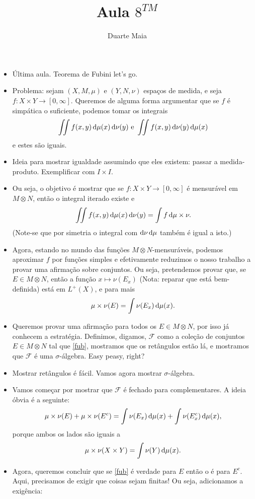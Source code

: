 \documentclass{article}
\title{Aula $8^{TM}$}
\author{Duarte Maia}
\date{}
\renewcommand{\cal}[1]{\mathcal{#1}}
\begin{document}
\maketitle

\begin{itemize}
\item Última aula. Teorema de Fubini let's go.
\item Problema: sejam $(X,M,\mu)$ e $(Y,N,\nu)$ espaços de medida, e seja $f : X \times Y \to [0,\infty]$. Queremos de alguma forma argumentar que se $f$ é simpática o suficiente, podemos tomar os integrais
\[\iint f(x,y) \dif \mu(x) \dif \nu(y) \text{ e } \iint f(x,y) \dif \nu(y) \dif \mu(x)\]
e estes são iguais.
\item Ideia para mostrar igualdade assumindo que eles existem: passar a medida-produto. Exemplificar com $I \times I$.
\item Ou seja, o objetivo é mostrar que se $f : X \times Y \to [0,\infty]$ é mensurável em $M \otimes N$, então o integral iterado existe e
\[\iint f(x,y) \dif \mu(x) \dif \nu(y) = \int f \dif \mu \times \nu.\]
(Note-se que por simetria o integral com $\dif \nu \dif \mu$ também é igual a isto.)
\item Agora, estando no mundo das funções $M \otimes N$-mensuráveis, podemos aproximar $f$ por funções simples e efetivamente reduzimos o nosso trabalho a provar uma afirmação sobre conjuntos. Ou seja, pretendemos provar que, se $E \in M \otimes N$, então a função $x \mapsto \nu(E_x)$ (Nota: reparar que está bem-definida) está em $L^+(X)$, e para mais
\begin{equation}\label{fub}
\mu \times \nu(E) = \int \nu(E_x) \dif \mu(x).
\end{equation}
\item Queremos provar uma afirmação para todos os $E \in M \otimes N$, por isso já conhecem a estratégia. Definimos, digamos, $\cal F$ como a coleção de conjuntos $E \in M \otimes N$ tal que \eqref{fub}, mostramos que os retângulos estão lá, e mostramos que $\cal F$ é uma $\sigma$-álgebra. Easy peasy, right?
\item Mostrar retângulos é fácil. Vamos agora mostrar $\sigma$-álgebra.
\item Vamos começar por mostrar que $\cal F$ é fechado para complementares. A ideia óbvia é a seguinte:
\[ \mu \times \nu(E) + \mu \times \nu(E^c) = \int \nu(E_x) \dif \mu(x) + \int \nu(E_x^c) \dif \mu(x),\]
porque ambos os lados são iguais a
\[\mu\times\nu(X\times Y) = \int \nu(Y) \dif \mu(x).\]
\item Agora, queremos concluir que se \eqref{fub} é verdade para $E$ então o é para $E^c$. Aqui, precisamos de exigir que coisas sejam finitas! Ou seja, adicionamos a exigência:

\end{itemize}
\end{document}
